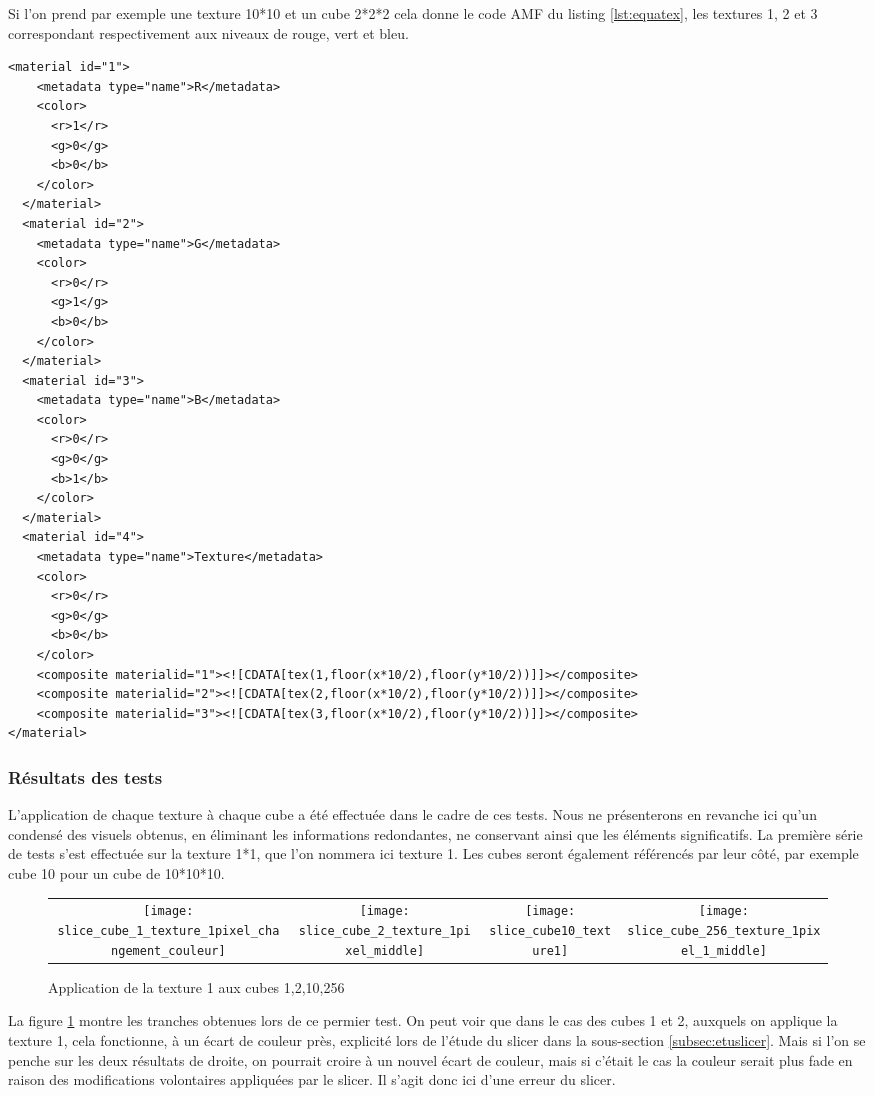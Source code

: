 \documentclass{tnreport}
\begin{document}
Si l'on prend par exemple une texture 10*10 et un cube 2*2*2 cela donne le code AMF du listing \ref{lst:equatex}, les textures 1, 2 et 3 correspondant respectivement aux niveaux de rouge, vert et bleu. 
\begin{lstlisting}[language=AMF, caption={Implémentation de la texture dans le solide}, label={lst:equatex}]
  <material id="1">
    <metadata type="name">R</metadata>
    <color>
      <r>1</r>
      <g>0</g>
      <b>0</b>
    </color>
  </material>
  <material id="2">
    <metadata type="name">G</metadata>
    <color>
      <r>0</r>
      <g>1</g>
      <b>0</b>
    </color>
  </material>
  <material id="3">
    <metadata type="name">B</metadata>
    <color>
      <r>0</r>
      <g>0</g>
      <b>1</b>
    </color>
  </material>
  <material id="4">
    <metadata type="name">Texture</metadata>
    <color>
      <r>0</r>
      <g>0</g>
      <b>0</b>
    </color>
    <composite materialid="1"><![CDATA[tex(1,floor(x*10/2),floor(y*10/2))]]></composite>
    <composite materialid="2"><![CDATA[tex(2,floor(x*10/2),floor(y*10/2))]]></composite>
    <composite materialid="3"><![CDATA[tex(3,floor(x*10/2),floor(y*10/2))]]></composite>
</material>
\end{lstlisting}

\subsubsection{Résultats des tests}
L'application de chaque texture à chaque cube a été effectuée dans le cadre de ces tests. Nous ne présenterons en revanche ici qu'un condensé des visuels obtenus, en éliminant les informations redondantes, ne conservant ainsi que les éléments significatifs. 
La première série de tests s'est effectuée sur la texture 1*1, que l'on nommera ici texture 1. Les cubes seront également référencés par leur côté, par exemple cube 10 pour un cube de 10*10*10. 
\begin{figure}[htb]
\centering
  \begin{tabular}{@{}cccc@{}}
    \texttt{[image: slice\_cube\_1\_texture\_1pixel\_changement\_couleur]} &
    \texttt{[image: slice\_cube\_2\_texture\_1pixel\_middle]} &
    \texttt{[image: slice\_cube10\_texture1]} &
    \texttt{[image: slice\_cube\_256\_texture\_1pixel\_1\_middle]}
  \end{tabular}
  \caption{Application de la texture 1 aux cubes 1,2,10,256}
  \label{fig:slicestex1}
\end{figure}
La figure \ref{fig:slicestex1} montre les tranches obtenues lors de ce permier test. On peut voir que dans le cas des cubes 1 et 2, auxquels on applique la texture 1, cela fonctionne, à un écart de couleur près, explicité lors de l'étude du slicer dans la sous-section \ref{subsec:etuslicer}. Mais si l'on se penche sur les deux résultats de droite, on pourrait croire à un nouvel écart de couleur, mais si c'était le cas la couleur serait plus fade en raison des modifications volontaires appliquées par le slicer. Il s'agit donc ici d'une erreur du slicer. \\
\end{document}
